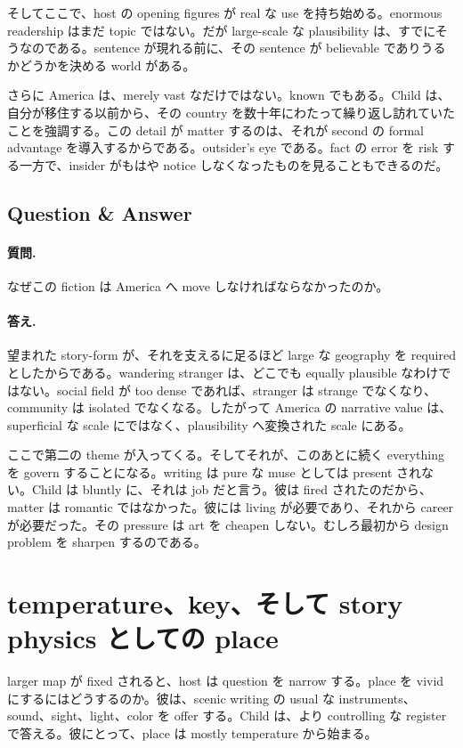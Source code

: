 そしてここで、host の opening figures が real な use を持ち始める。enormous readership はまだ topic ではない。だが large-scale な plausibility は、すでにそうなのである。sentence が現れる前に、その sentence が believable でありうるかどうかを決める world がある。

さらに America は、merely vast なだけではない。known でもある。Child は、自分が移住する以前から、その country を数十年にわたって繰り返し訪れていたことを強調する。この detail が matter するのは、それが second の formal advantage を導入するからである。outsider's eye である。fact の error を risk する一方で、insider がもはや notice しなくなったものを見ることもできるのだ。

\subsection{Question \& Answer}

\paragraph{質問.} なぜこの fiction は America へ move しなければならなかったのか。

\paragraph{答え.} 望まれた story-form が、それを支えるに足るほど large な geography を required としたからである。wandering stranger は、どこでも equally plausible なわけではない。social field が too dense であれば、stranger は strange でなくなり、community は isolated でなくなる。したがって America の narrative value は、superficial な scale にではなく、plausibility へ変換された scale にある。

ここで第二の theme が入ってくる。そしてそれが、このあとに続く everything を govern することになる。writing は pure な muse としては present されない。Child は bluntly に、それは job だと言う。彼は fired されたのだから、matter は romantic ではなかった。彼には living が必要であり、それから career が必要だった。その pressure は art を cheapen しない。むしろ最初から design problem を sharpen するのである。

\section{temperature、key、そして story physics としての place}

larger map が fixed されると、host は question を narrow する。place を vivid にするにはどうするのか。彼は、scenic writing の usual な instruments、sound、sight、light、color を offer する。Child は、より controlling な register で答える。彼にとって、place は mostly temperature から始まる。

